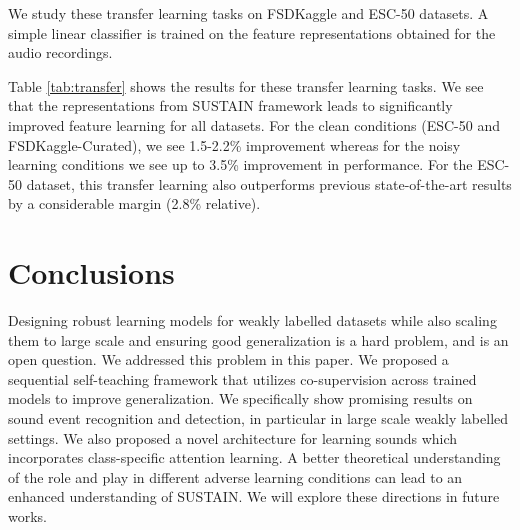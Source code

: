 \documentclass{article}
\begin{document}
We study these transfer learning tasks on FSDKaggle and ESC-50 datasets. A simple linear classifier is trained on the feature representations obtained for the audio recordings. 

Table \ref{tab:transfer} shows the results for these transfer learning tasks. We see that the representations from SUSTAIN framework leads to significantly improved feature learning for all datasets. For the clean conditions (ESC-50 and FSDKaggle-Curated), we see 1.5-2.2\% improvement whereas for the noisy learning conditions we see up to 3.5\% improvement in performance.  For the ESC-50 dataset, this transfer learning also outperforms previous state-of-the-art results by a considerable margin (2.8\% relative). 

\begin{table}[t!]
  \centering
    \caption{Transfer Learning from SUSTAIN Models trained on Audioset. Results on ESC-50 and FSDKaggle dataset.}
  \label{tab:transfer}\end{table}



\section{Conclusions} \label{sec:conc}


Designing robust learning models for weakly labelled datasets while also scaling them to large scale and ensuring good generalization is a hard problem, and is an open question. 
We addressed this problem in this paper. We proposed a sequential self-teaching framework that utilizes co-supervision across trained models to improve generalization. 
We specifically show promising results on sound event recognition and detection, in particular in large scale weakly labelled settings. We also proposed a novel architecture for learning sounds which incorporates class-specific attention learning. A better theoretical understanding of the role  and  play in different adverse learning conditions can lead to an enhanced understanding of SUSTAIN. We will explore these directions in future works. 
\end{document}

